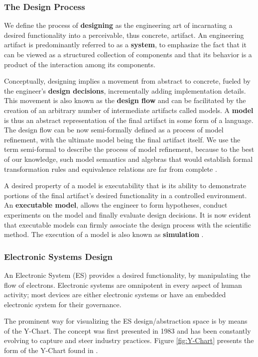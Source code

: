 \documentclass[11pt]{article}
\begin{document}
\subsubsection{The Design Process}
\label{sec:orgddd33d1}
We define the process of \textbf{designing} as the engineering art of incarnating a desired functionality into a perceivable, thus concrete, artifact.
An engineering artifact is predominantly referred to as a \textbf{system}, 
to emphasize the fact that it can be viewed as a structured collection of components and that its behavior is a product of the interaction among its components.

Conceptually, designing implies a movement from abstract to concrete, fueled by the engineer's \textbf{design decisions}, incrementally adding implementation details.
This movement is also known as the \textbf{design flow} and can be facilitated by the creation of an arbitrary number of intermediate artifacts called models.
A \textbf{model} is thus an abstract representation of the final artifact in some form of a language.
The design flow can be now semi-formally defined as a process of model refinement, with the ultimate model being the final artifact itself.
We use the term semi-formal to describe the process of model refinement, because to the best of our knowledge, 
such model semantics and algebras that would establish formal transformation rules and equivalence relations are far from complete \cite{Gajski2009}.

A desired property of a model is executability that is its ability to demonstrate portions of the final artifact's desired functionality in a controlled environment.
An \textbf{executable model}, allows the engineer to form hypotheses, conduct experiments on the model and finally evaluate design decisions.
It is now evident that executable models can firmly associate the design process with the scientific method.
The execution of a model is also known as \textbf{simulation} \cite{Editor2014}.


\subsubsection{Electronic Systems Design}
\label{sec:org4372ec4}
An Electronic System (ES) provides a desired functionality, by manipulating the flow of electrons.
Electronic systems are omnipotent in every aspect of human activity; 
most devices are either electronic systems or have an embedded electronic system for their governance.

The prominent way for visualizing the ES design/abstraction space is by means of the Y-Chart.
The concept was first presented in 1983 \cite{Gajski1983} and has been constantly evolving to capture and steer industry practices.
Figure \ref{fig:Y-Chart} presents the form of the Y-Chart found in \cite{Gajski2009}.
\end{document}
